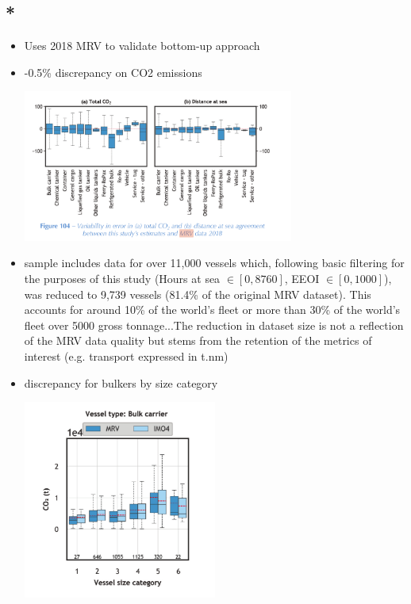 \documentclass{article}
\newcommand{\paperpath}{../resources/}
\newcommand{\myhref}[2]{\href{run:\paperpath#1}{#2}}
\begin{document}
\subsection{*\myhref{Fourth IMO GHG Study 2020 - Full report and annexes.pdf}{\textcite{faber2020fourth}}}
\begin{itemize}
    \item Uses 2018 MRV to validate bottom-up approach
    \item -0.5\% discrepancy on CO2 emissions
    \begin{center}
    \includegraphics[width=0.7\textwidth]{"Page 140 Figure 104 Comparison Emissions and Distance with MRV.png"}
    \end{center}
    \item sample includes data for over 11,000 vessels which, following basic filtering for the purposes of this study (Hours at sea $\in [0, 8760]$, EEOI $\in [0, 1000]$), was reduced to 9,739 vessels  (81.4\% of the original MRV dataset). This accounts for around 10\% of the world’s fleet or more than 30\% of the world’s fleet over 5000 gross tonnage...The reduction in dataset size is not a reflection of the MRV data quality but stems from the retention of the metrics of interest (e.g. transport expressed in t.nm)
    \item discrepancy for bulkers by size category
    \begin{center}
        \includegraphics[width=0.5\textwidth]{"Page 142 Figure 106 Bulker Emissions Compared to MRV.png"}

\end{center}
\end{itemize}
\end{document}
